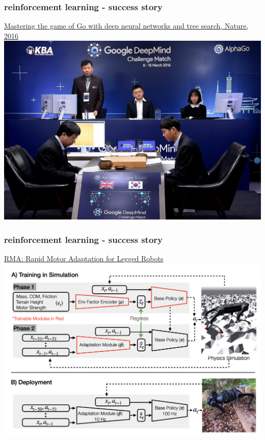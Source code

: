 \documentclass{beamer}
\begin{document}
\begin{frame}
  \frametitle{reinforcement learning - success story}
  
  \href{https://www.nature.com/articles/nature16961}{Mastering the game of Go with deep neural networks and tree search, Nature, 2016}
  \centering
  \includegraphics[scale=0.25]{../images/alpha_go.jpg}
    
\end{frame}


\begin{frame}
  \frametitle{reinforcement learning - success story}
  
  \href{https://arxiv.org/abs/2107.04034}{RMA: Rapid Motor Adaptation for Legged Robots}
  \centering
  \includegraphics[scale=0.35]{../images/rma.png}
    
\end{frame}
\end{document}
